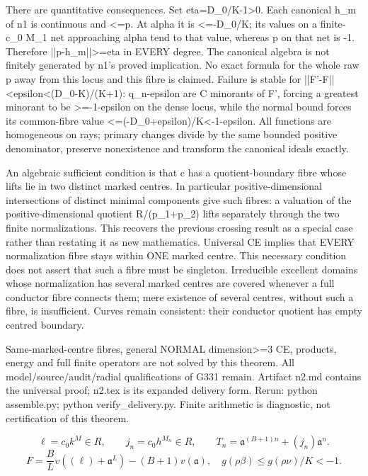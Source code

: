 There are quantitative consequences. Set eta=D\_0/K-1\textgreater{}0. Each canonical h\_m of n1 is continuous and \textless{}=p. At alpha it is \textless{}=-D\_0/K; its values on a finite-c\_0 M\_1 net approaching alpha tend to that value, whereas p on that net is -1. Therefore ||p-h\_m||\textgreater{}=eta in EVERY degree. The canonical algebra is not finitely generated by n1's proved implication. No exact formula for the whole raw p away from this locus and this fibre is claimed. Failure is stable for ||F'-F||\textless{}epsilon\textless{}(D\_0-K)/(K+1): q\_n-epsilon are C minorants of F', forcing a greatest minorant to be \textgreater{}=-1-epsilon on the dense locus, while the normal bound forces its common-fibre value \textless{}=(-D\_0+epsilon)/K\textless{}-1-epsilon. All functions are homogeneous on rays; primary changes divide by the same bounded positive denominator, preserve nonexistence and transform the canonical ideals exactly.

An algebraic sufficient condition is that c has a quotient-boundary fibre whose lifts lie in two distinct marked centres. In particular positive-dimensional intersections of distinct minimal components give such fibres: a valuation of the positive-dimensional quotient R/(p\_1+p\_2) lifts separately through the two finite normalizations. This recovers the previous crossing result as a special case rather than restating it as new mathematics. Universal CE implies that EVERY normalization fibre stays within ONE marked centre. This necessary condition does not assert that such a fibre must be singleton. Irreducible excellent domains whose normalization has several marked centres are covered whenever a full conductor fibre connects them; mere existence of several centres, without such a fibre, is insufficient. Curves remain consistent: their conductor quotient has empty centred boundary.

Same-marked-centre fibres, general NORMAL dimension\textgreater{}=3 CE, products, energy and full finite operators are not solved by this theorem. All model/source/audit/radial qualifications of G331 remain. Artifact n2.md contains the universal proof; n2.tex is its expanded delivery form. Rerun: python assemble.py; python verify\_delivery.py. Finite arithmetic is diagnostic, not certification of this theorem.

\[
 \ell=c_0k^M\in R,\qquad j_n=c_0h^{M_n}\in R,\qquad
 T_n=\mathfrak a^{(B+1)n}+(j_n)\mathfrak a^n.
\]
\[
 F=\frac BL v((\ell)+\mathfrak a^L)-(B+1)v(\mathfrak a),\quad
 g(\rho\beta)\le g(\rho\nu)/K<-1.
\]

